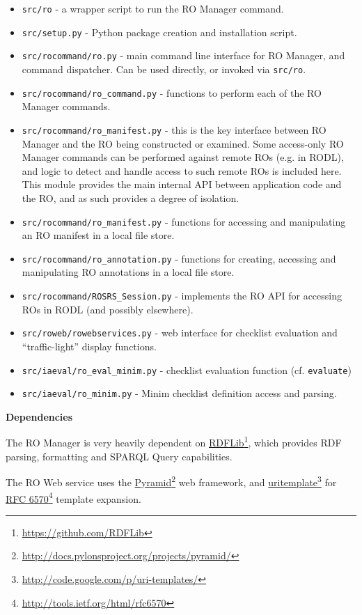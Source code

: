 \begin{itemize}

\item \texttt{src/ro} - a wrapper script to run the RO Manager command.
\item \texttt{src/setup.py} - Python package creation and installation script.
\item \texttt{src/rocommand/ro.py} - main command line interface for RO Manager, and command dispatcher.  Can be used directly, or invoked via \texttt{src/ro}.
\item \texttt{src/rocommand/ro\_command.py} - functions to perform each of the RO Manager commands.
\item \texttt{src/rocommand/ro\_manifest.py} - this is the key interface between RO Manager and the RO being constructed or examined.  Some access-only RO Manager commands can be performed against remote ROs (e.g. in RODL), and logic to detect and handle access to such remote ROs is included here.  This module provides the main internal API between application code and the RO, and as such provides a degree of isolation.
\item \texttt{src/rocommand/ro\_manifest.py} - functions for accessing and manipulating an RO manifest in a local file store.
\item \texttt{src/rocommand/ro\_annotation.py} - functions for creating, accessing and manipulating RO annotations in a local file store.
\item \texttt{src/rocommand/ROSRS\_Session.py} - implements the RO API for accessing ROs in RODL (and possibly elsewhere).
\item \texttt{src/roweb/rowebservices.py} - web interface for checklist evaluation and ``traffic-light'' display functions.
\item \texttt{src/iaeval/ro\_eval\_minim.py} - checklist evaluation function (cf. \texttt{evaluate})
\item \texttt{src/iaeval/ro\_minim.py} - Minim checklist definition access and parsing.
\end{itemize}

\textbf{Dependencies}
\label{dependencies}

The RO Manager is very heavily dependent on \href{https://github.com/RDFLib}{RDFLib}\footnote{\href{https://github.com/RDFLib}{https://github.com/RDFLib}}, which provides RDF parsing, formatting and SPARQL Query capabilities.

The RO Web service uses the \href{http://docs.pylonsproject.org/projects/pyramid/}{Pyramid}\footnote{\href{http://docs.pylonsproject.org/projects/pyramid/}{http://docs.pylonsproject.org/projects/pyramid/}} web framework, and \href{http://code.google.com/p/uri-templates/}{uritemplate}\footnote{\href{http://code.google.com/p/uri-templates/}{http://code.google.com/p/uri-templates/}} for \href{http://tools.ietf.org/html/rfc6570}{RFC 6570}\footnote{\href{http://tools.ietf.org/html/rfc6570}{http://tools.ietf.org/html/rfc6570}} template expansion.


